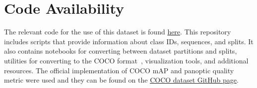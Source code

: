\section*{Code Availability}
The relevant code for the use of this dataset is found \href{https://github.com/labdeeman7/cholec_instance_seg}{here}. This repository includes scripts that provide information about class IDs, sequences, and splits. It also contains notebooks for converting between dataset partitions and splits, utilities for converting to the COCO format~\cite{lin2014microsoft}, visualization tools,  and additional resources. The official implementation of COCO mAP and panoptic quality metric were used and they can be found on the \href{https://github.com/orgs/cocodataset/repositories}{COCO dataset GitHub page}.




